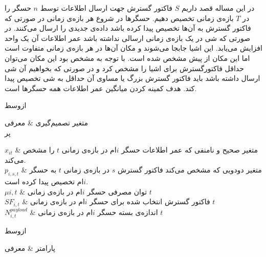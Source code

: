 

در این مساله قصد داریم $S$ فاکتور گسترش جهت ارسال اطلاعات توسط $n$ حسگر را در $T$ بازه‌ی زمانی تخصیص دهیم.
حسگرها در شروع هر بازه‌ی زمانی در صورتی که فاکتور گسترش به آن‌ها تخصیص پیدا کرده باشد داده‌ی جدیدی را ارسال می‌کنند.
در صورتی که شی در یک بازه‌ی زمانی ارسالی نداشته باشد عمر اطلاعات آن یک واحد افزایش می‌یابد.
این اشیا جابجا می‌شوند و مکان آن‌ها در هر بازه‌ی زمانی متفاوت است اما این مکان از پیش مشخص شده است.
با توجه به مشخص بود این مکان می‌توان حداقل فاکتورگسترش برای اشیا را مشخص کرد و در صورتی که بخواهیم آن شی ارسال داشته باشد
باید فاکتور گسترش بزرگ یا مساوی آن حداقل به شی تخصیص پیدا کند.
هدف کمینه کردن میانگین عمر اطلاعات همه حسگر‌ها است.


‌ازوسط



متغیر تصمیم‌گیری & معرفی \\

‌پر

$x_{it}$ & متغیر صحیح و نامنفی که عمر اطلاعات حسگر $i$ام در بازه‌ی زمانی $t$ را مشخص می‌کند. \\

$p_{i,s,t}$ & متغیر دودویی که مشخص می‌کند فاکتور گسترش $s$ در بازه‌ی زمانی $t$ به حسگر $i$ام تخصیص پیدا کرده است. \\

$\mu{i,t}$ & توان مصرفی حسگر $i$ام در بازه‌ی زمانی $t$ \\

$SF_{i,t}$ & فاکتور گسترش انتخاب شده برای حسگر $i$ام در بازه‌ی زمانی $t$ \\

$N^{payload}_{i,t}$ & اندازه‌ی بسته حسگر $i$ام در بازه‌ی زمانی $t$ \\





‌ازوسط



پارامتر & معرفی \\

